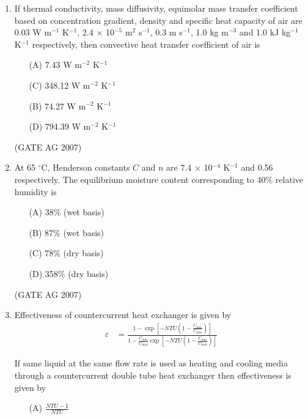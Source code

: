 \documentclass[journal,12pt,onecolumn]{IEEEtran}
\theoremstyle{remark}
\begin{document}
\begin{enumerate}[label=Q\arabic*:]
\item If thermal conductivity, mass diffusivity, equimolar mass transfer coefficient based on concentration gradient, density and specific heat capacity of air are 0.03 W m$^{-1}$ K$^{-1}$, 2.4 $\times$ 10$^{-5}$ m$^{2}$ s$^{-1}$, 0.3 m s$^{-1}$, 1.0 kg m$^{-3}$ and 1.0 kJ kg$^{-1}$ K$^{-1}$ respectively, then convective heat transfer coefficient of air is
\begin{multicols}{2}
\begin{enumerate}
    \item[(A)] 7.43 W m$^{-2}$ K$^{-1}$
    \item[(C)] 348.12 W m$^{-2}$ K$^{-1}$
    \item[(B)] 74.27 W m$^{-2}$ K$^{-1}$
    \item[(D)] 794.39 W m$^{-2}$ K$^{-1}$
\end{enumerate}
\end{multicols}
\hfill(GATE AG 2007)

\item  At 65 $^{\circ}$C, Henderson constants $C$ and $n$ are 7.4 $\times$ 10$^{-4}$ K$^{-1}$ and 0.56 respectively. The equilibrium moisture content corresponding to 40\% relative humidity is
\begin{multicols}{2}
\begin{enumerate}
    \item[(A)] 38\% (wet basis)
    \item[(B)] 87\% (wet basis)
    \item[(C)] 78\% (dry basis)
    \item[(D)] 358\% (dry basis)
\end{enumerate}
\end{multicols}
\hfill(GATE AG 2007)

\item  Effectiveness of countercurrent heat exchanger is given by
\begin{align*}
\varepsilon &= 
\frac{1 - \exp\left[-NTU\left(1 - \frac{C_{\min}}{C_{\max}}\right)\right]}
{1 - \frac{C_{\min}}{C_{\max}} 
\exp\left[-NTU\left(1 - \frac{C_{\min}}{C_{\max}}\right)\right]}
\end{align*}

If same liquid at the same flow rate is used as heating and cooling media through a countercurrent double tube heat exchanger then effectiveness is given by
\begin{multicols}{2}
\begin{enumerate}
    \item[(A)] $\frac{NTU - 1}{NTU}$
    

\end{enumerate}
\end{multicols}
\end{enumerate}
\end{document}

